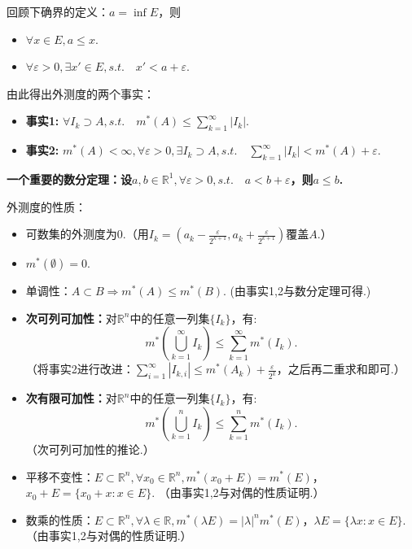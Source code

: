 \documentclass[bwprint, withoutpreface]{cumcmthesis}
\begin{document}
回顾下确界的定义：$a = \inf E$，则
\begin{itemize}[itemindent=2em]
	\item $\forall x \in E, a \leqslant x$.
	\item $\forall \varepsilon > 0, \exists x' \in E, s.t. \quad x' < a + \varepsilon$.
\end{itemize}

由此得出外测度的两个事实：
\begin{itemize}[itemindent=2em]
	\item \textbf{事实1:} $\forall {I_k} \supset A, s.t. \quad m^*(A) \leqslant \sum_{k = 1}^{\infty}|I_k|$.
	\item \textbf{事实2:} $m^*(A) < \infty, \forall \varepsilon > 0, \exists {I_k} \supset A, s.t. \quad \sum_{k = 1}^{\infty}|I_k| < m^*(A) + \varepsilon$.
\end{itemize}

\textbf{一个重要的数分定理：设$a, b \in \mathbb{R}^1, \forall \varepsilon > 0, s.t. \quad a < b + \varepsilon$，则$a \leqslant b$.}

外测度的性质：
\begin{itemize}[itemindent=2em]
	\item 可数集的外测度为$0$.（用$I_k = (a_k - \frac{\varepsilon}{2^{k + 1}}, a_k + \frac{\varepsilon}{2^{k + 1}})$覆盖$A$.）
	\item $m^*(\emptyset) = 0$.
	\item 单调性：$A \subset B \Rightarrow m^*(A) \leqslant m^*(B)$. (由事实1,2与数分定理可得.)
	\item \textbf{次可列可加性：}对$\mathbb{R}^n$中的任意一列集$\{I_k\}$，有:
	\begin{equation*}
		m^*(\bigcup_{k = 1}^{\infty}{I_k}) \leqslant \sum_{k = 1}^{\infty}{m^*(I_k)}.
	\end{equation*}（将事实2进行改进：$\sum_{i = 1}^{\infty}|I_{k, i}| \leqslant m^*(A_k) + \frac{\varepsilon}{2^k}$，之后再二重求和即可.）
	\item \textbf{次有限可加性：}对$\mathbb{R}^n$中的任意一列集$\{I_k\}$，有:
	\begin{equation*}
		m^*(\bigcup_{k = 1}^{n}{I_k}) \leqslant \sum_{k = 1}^{n}{m^*(I_k)}.
	\end{equation*}（次可列可加性的推论.）
	\item 平移不变性：$E \subset \mathbb{R}^n, \forall x_0 \in \mathbb{R}^n, m^*(x_0 + E) = m^*(E)$，$x_0 + E = \{x_0 + x: x \in E\}.$ （由事实1,2与对偶的性质证明.）
	\item 数乘的性质：$E \subset \mathbb{R}^n, \forall \lambda \in \mathbb{R}, m^*(\lambda E) = |\lambda|^n m^*(E)$，$\lambda E = \{\lambda x: x \in E\}.$ （由事实1,2与对偶的性质证明.）
\end{itemize}
\end{document}
